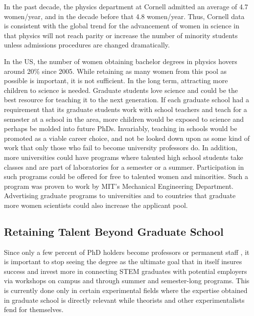 \documentclass[utf8]{frontiersSCNS} %
\begin{document}
In the past decade, the physics department at Cornell admitted an average of 4.7 women/year, and in the decade before that 4.8 women/year. Thus, Cornell data is consistent with the global trend for the advancement of women in science in that physics will not reach parity or increase the number of minority students unless admissions procedures are changed dramatically. 

In the US, the number of women obtaining bachelor degrees in physics hovers around 20\% since 2005. While retaining as many women from this pool as possible is important, it is not sufficient.  In the long term, attracting more children to science is needed. Graduate students love science and could be the best resource for teaching it to the next generation. If each graduate school had a requirement that its graduate students work with school teachers and teach for a semester at a school in the area, more children would be exposed to science and perhaps be molded into future PhDs. Invariably, teaching in schools would be promoted as a viable career choice, and not be looked down upon as some kind of work that only those who fail to become university professors do. In addition, more universities could have programs where talented high school students take classes and are part of laboratories for a semester or a summer. Participation in such programs could be offered for free to talented women and minorities. Such a program was proven to work by MIT's Mechanical Engineering Department. Advertising graduate programs to universities and to countries that graduate more women scientists could also increase the applicant pool.

\subsection{Retaining Talent Beyond Graduate School}
\label{6.3}
Since only a few percent of PhD holders become professors or permanent staff \citep{larson2014too}, it is important to stop seeing the degree as the ultimate goal that in itself insures success and invest more in connecting STEM graduates with potential employers via workshops on campus and through summer and semester-long programs. This is currently done only in certain experimental fields where the expertise obtained in graduate school is directly relevant while theorists and other experimentalists fend for themselves. 
\end{document}
